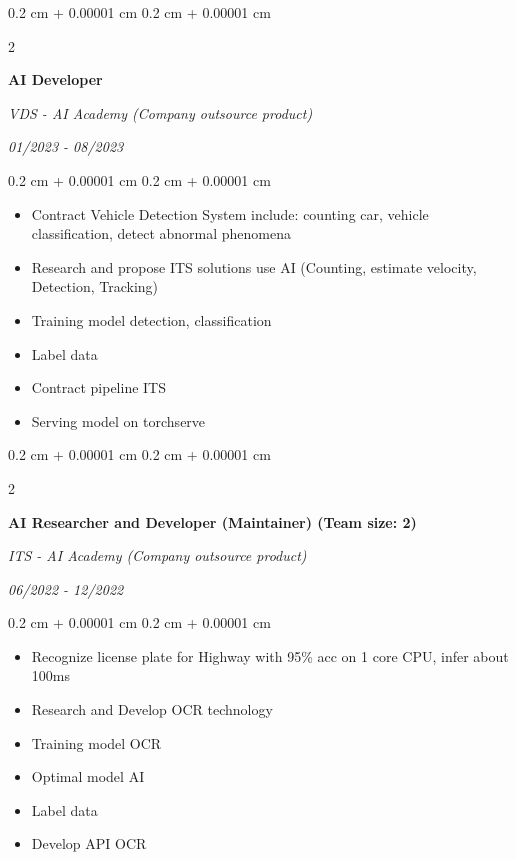 \documentclass[10pt, letterpaper]{article}
\newenvironment{highlights}{
    \begin{itemize}[
        topsep=0.10 cm,
        parsep=0.10 cm,
        partopsep=0pt,
        itemsep=0pt,
        leftmargin=0.4 cm + 10pt
    ]
}{
    \end{itemize}
} %
\newenvironment{onecolentry}{
    \begin{adjustwidth}{
        0.2 cm + 0.00001 cm
    }{
        0.2 cm + 0.00001 cm
    }
}{
    \end{adjustwidth}
} %
\newenvironment{twocolentry}[2][]{
    \onecolentry
    \def\secondColumn{#2}
    \setcolumnwidth{\fill, 4.5 cm}
    \begin{paracol}{2}
}{
    \switchcolumn \raggedleft \secondColumn
    \end{paracol}
    \endonecolentry
} %
\begin{document}
    \begin{twocolentry}{
        \textit{01/2023 - 08/2023}
    }
        \textbf{AI Developer}
        
        \textit{VDS - AI Academy (Company outsource product)}
    \end{twocolentry}

    \begin{onecolentry}
        \begin{highlights}
            \item Contract Vehicle Detection System include: counting car, vehicle classification, detect abnormal phenomena
            \item Research and propose ITS solutions use AI (Counting, estimate velocity, Detection, Tracking)
            \item Training model detection, classification
            \item Label data
            \item Contract pipeline ITS
            \item Serving model on torchserve
        \end{highlights}
    \end{onecolentry}

    \vspace{0.2 cm}

    \begin{twocolentry}{
        \textit{06/2022 - 12/2022}
    }
        \textbf{AI Researcher and Developer (Maintainer) (Team size: 2)}
        
        \textit{ITS - AI Academy (Company outsource product)}
    \end{twocolentry}

    \begin{onecolentry}
        \begin{highlights}
            \item Recognize license plate for Highway with 95\% acc on 1 core CPU, infer about 100ms
            \item Research and Develop OCR technology
            \item Training model OCR
            \item Optimal model AI
            \item Label data
            \item Develop API OCR
        \end{highlights}
    \end{onecolentry}
\end{document}
